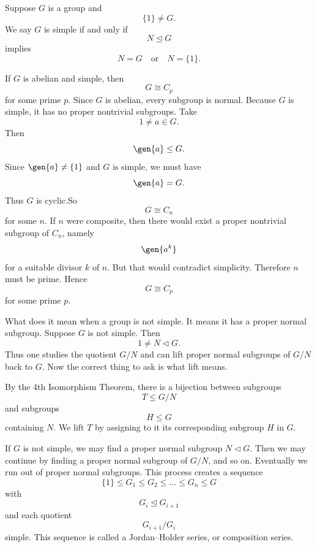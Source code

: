 \begin{definition}
    Suppose $G$ is a group and
    \[
        \{1\}\neq G.
    \]
    We say $G$ is simple if and only if
    \[
        N\trianglelefteq G
    \]
    implies
    \[
        N=G
        \quad\text{or}\quad
        N=\{1\}.
    \]
\end{definition}

\begin{theorem}{
    If $G$ is abelian and simple, then
    \[
        G\cong C_p
    \]
    for some prime $p$.
}
Since $G$ is abelian, every subgroup is normal.
Because $G$ is simple, it has no proper nontrivial subgroups.
Take
\[
    1\neq a\in G.
\]
Then
\[
    \gen{a}\leq G.
\]
Since $\gen{a}\neq \{1\}$ and $G$ is simple, we must have
\[
    \gen{a}=G.
\]
Thus $G$ is cyclic.So
\[
    G\cong C_n
\]
for some $n$.
If $n$ were composite, then there would exist a proper nontrivial subgroup of $C_n$, namely
\[
    \gen{a^k}
\]
for a suitable divisor $k$ of $n$.
But that would contradict simplicity.
Therefore $n$ must be prime.
Hence
\[
    G\cong C_p
\]
for some prime $p$.
\end{theorem}

What does it mean when a group is not simple.
It means it has a proper normal subgroup.
Suppose $G$ is not simple.
Then
\[
    1\neq N\triangleleft G.
\]
Thus one studies the quotient $G/N$ and can lift proper normal subgroups of $G/N$ back to $G$.
Now the correct thing to ask is what lift means.

\begin{definition}[Lift]
    By the 4th Isomorphism Theorem, there is a bijection between subgroups
    \[
        T\leq G/N
    \]
    and subgroups
    \[
        H\leq G
    \]
    containing $N$.
    We lift $T$ by assigning to it its corresponding subgroup $H$ in $G$.
\end{definition}

\begin{definition}
    If $G$ is not simple, we may find a proper normal subgroup $N\triangleleft G$.
    Then we may continue by finding a proper normal subgroup of $G/N$, and so on.
    Eventually we run out of proper normal subgroups.
    This process creates a sequence
    \[
        \{1\}\leq G_1\leq G_2\leq \dots \leq G_n\leq G
    \]
    with
    \[
        G_i\trianglelefteq G_{i+1}
    \]
    and each quotient
    \[
        G_{i+1}/G_i
    \]
    simple.
    This sequence is called a Jordan--Holder series, or composition series.
\end{definition}

